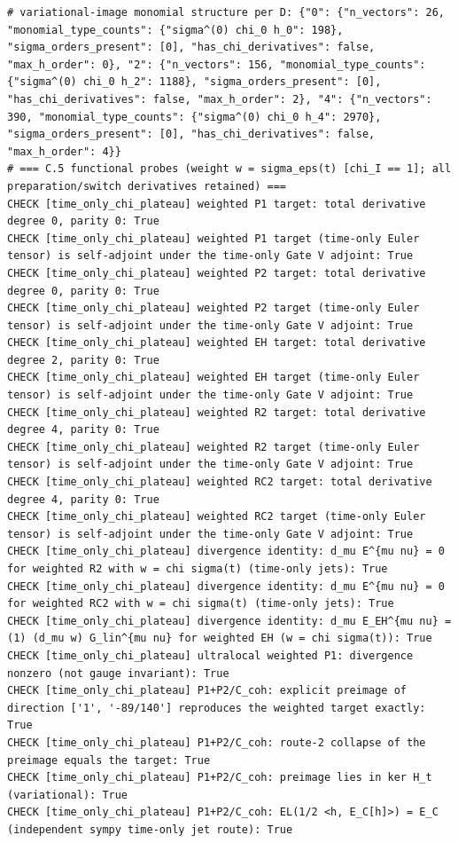 \documentclass{article}
\theoremstyle{remark}
\begin{document}
\begin{lstlisting}
# variational-image monomial structure per D: {"0": {"n_vectors": 26, "monomial_type_counts": {"sigma^(0) chi_0 h_0": 198}, "sigma_orders_present": [0], "has_chi_derivatives": false, "max_h_order": 0}, "2": {"n_vectors": 156, "monomial_type_counts": {"sigma^(0) chi_0 h_2": 1188}, "sigma_orders_present": [0], "has_chi_derivatives": false, "max_h_order": 2}, "4": {"n_vectors": 390, "monomial_type_counts": {"sigma^(0) chi_0 h_4": 2970}, "sigma_orders_present": [0], "has_chi_derivatives": false, "max_h_order": 4}}
# === C.5 functional probes (weight w = sigma_eps(t) [chi_I == 1]; all preparation/switch derivatives retained) ===
CHECK [time_only_chi_plateau] weighted P1 target: total derivative degree 0, parity 0: True
CHECK [time_only_chi_plateau] weighted P1 target (time-only Euler tensor) is self-adjoint under the time-only Gate V adjoint: True
CHECK [time_only_chi_plateau] weighted P2 target: total derivative degree 0, parity 0: True
CHECK [time_only_chi_plateau] weighted P2 target (time-only Euler tensor) is self-adjoint under the time-only Gate V adjoint: True
CHECK [time_only_chi_plateau] weighted EH target: total derivative degree 2, parity 0: True
CHECK [time_only_chi_plateau] weighted EH target (time-only Euler tensor) is self-adjoint under the time-only Gate V adjoint: True
CHECK [time_only_chi_plateau] weighted R2 target: total derivative degree 4, parity 0: True
CHECK [time_only_chi_plateau] weighted R2 target (time-only Euler tensor) is self-adjoint under the time-only Gate V adjoint: True
CHECK [time_only_chi_plateau] weighted RC2 target: total derivative degree 4, parity 0: True
CHECK [time_only_chi_plateau] weighted RC2 target (time-only Euler tensor) is self-adjoint under the time-only Gate V adjoint: True
CHECK [time_only_chi_plateau] divergence identity: d_mu E^{mu nu} = 0 for weighted R2 with w = chi sigma(t) (time-only jets): True
CHECK [time_only_chi_plateau] divergence identity: d_mu E^{mu nu} = 0 for weighted RC2 with w = chi sigma(t) (time-only jets): True
CHECK [time_only_chi_plateau] divergence identity: d_mu E_EH^{mu nu} = (1) (d_mu w) G_lin^{mu nu} for weighted EH (w = chi sigma(t)): True
CHECK [time_only_chi_plateau] ultralocal weighted P1: divergence nonzero (not gauge invariant): True
CHECK [time_only_chi_plateau] P1+P2/C_coh: explicit preimage of direction ['1', '-89/140'] reproduces the weighted target exactly: True
CHECK [time_only_chi_plateau] P1+P2/C_coh: route-2 collapse of the preimage equals the target: True
CHECK [time_only_chi_plateau] P1+P2/C_coh: preimage lies in ker H_t (variational): True
CHECK [time_only_chi_plateau] P1+P2/C_coh: EL(1/2 <h, E_C[h]>) = E_C (independent sympy time-only jet route): True

\end{lstlisting}
\end{document}
